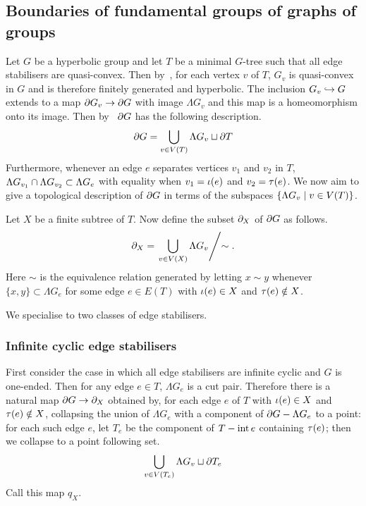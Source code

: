 \subsection{Boundaries of fundamental groups of graphs of groups}

Let $G$ be a hyperbolic group and let $T$ be a minimal $G$-tree such that all edge stabilisers are quasi-convex.
Then by~\cite[Proposition 1.2]{bowditch98}, for each vertex $v$ of $T$, $G_v$ is quasi-convex in $G$ and is therefore finitely generated and hyperbolic.
The inclusion $G_v \hookrightarrow G$ extends to a map $\partial G_v \to \partial G$ with image $\Lambda G_v$ and this map is a homeomorphism onto its image.
Then by~\cite[Proposition 1.3]{bowditch98} $\partial G$ has the following description.
\begin{align}\label{equation:boundary_union}
  \partial G = \bigcup_{v \in V(T)} \Lambda G_v \sqcup \partial T
\end{align}
Furthermore, whenever an edge $e$ separates vertices $v_1$ and $v_2$ in $T$, $\Lambda G_{v_1} \cap \Lambda G_{v_2} \subset \Lambda G_e$ with equality when $v_1 = \operatorname{\iota}(e)$ and $v_2 = \operatorname{\tau}(e)$.
We now aim to give a topological description of $\partial G$ in terms of the subspaces $\{\Lambda G_v \mid v \in V(T)\}$.

Let $X$ be a finite subtree of $T$.
Now define the subset $\partial_X$ of $\partial G$ as follows.
\begin{align}
  \partial_X = \left.\bigcup_{v \in V(X)} \Lambda G_v \middle/\sim \right..
\end{align}
Here $\sim$ is the equivalence relation generated by letting $x\sim y$ whenever $\{x,y\} \subset \Lambda G_e$ for some edge $e \in E(T)$ with $\operatorname{\iota}(e) \in X$ and $\operatorname{\tau}(e) \notin X$.

We specialise to two classes of edge stabilisers.

\subsubsection{Infinite cyclic edge stabilisers}

First consider the case in which all edge stabilisers are  infinite cyclic and $G$ is one-ended.
Then for any edge $e \in T$, $\Lambda G_e$ is a cut pair.
Therefore there is a natural map $\partial G \to \partial_X$ obtained by, for each edge $e$ of $T$ with $\operatorname{\iota}(e) \in X$ and $\operatorname{\tau}(e) \notin X$, collapsing the union of $\Lambda G_e$ with a component of $\partial G - \Lambda G_e$ to a point: for each such edge $e$, let $T_e$ be the component of $T - \operatorname{int} e$ containing $\operatorname{\tau}(e)$; then we collapse to a point following set.
\begin{align}
  \bigcup_{v \in V(T_e)} \Lambda G_v \sqcup \partial T_e
\end{align}
Call this map $q_X$.

